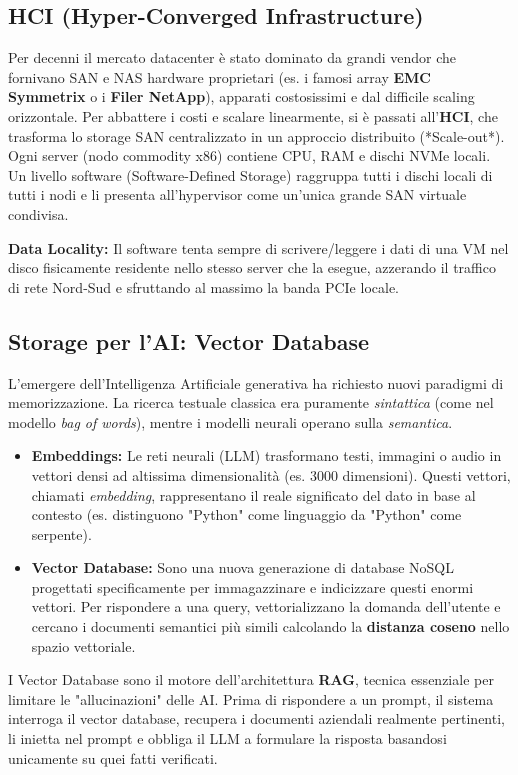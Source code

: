 \subsection{HCI (Hyper-Converged Infrastructure)}
Per decenni il mercato datacenter è stato dominato da grandi vendor che fornivano SAN e NAS hardware proprietari (es. i famosi array \textbf{EMC Symmetrix} o i \textbf{Filer NetApp}), apparati costosissimi e dal difficile scaling orizzontale. 
Per abbattere i costi e scalare linearmente, si è passati all'\textbf{HCI}, che trasforma lo storage SAN centralizzato in un approccio distribuito (*Scale-out*). Ogni server (nodo commodity x86) contiene CPU, RAM e dischi NVMe locali. Un livello software (Software-Defined Storage) raggruppa tutti i dischi locali di tutti i nodi e li presenta all'hypervisor come un'unica grande SAN virtuale condivisa.
\begin{tipbox}
\textbf{Data Locality:} Il software tenta sempre di scrivere/leggere i dati di una VM nel disco fisicamente residente nello stesso server che la esegue, azzerando il traffico di rete Nord-Sud e sfruttando al massimo la banda PCIe locale.
\end{tipbox}

\subsection{Storage per l'AI: Vector Database}
L'emergere dell'Intelligenza Artificiale generativa ha richiesto nuovi paradigmi di memorizzazione. La ricerca testuale classica era puramente \textit{sintattica} (come nel modello \textit{bag of words}), mentre i modelli neurali operano sulla \textit{semantica}.
\begin{itemize}
    \item \textbf{Embeddings:} Le reti neurali (LLM) trasformano testi, immagini o audio in vettori densi ad altissima dimensionalità (es. 3000 dimensioni). Questi vettori, chiamati \textit{embedding}, rappresentano il reale significato del dato in base al contesto (es. distinguono "Python" come linguaggio da "Python" come serpente).
    \item \textbf{Vector Database:} Sono una nuova generazione di database NoSQL progettati specificamente per immagazzinare e indicizzare questi enormi vettori. Per rispondere a una query, vettorializzano la domanda dell'utente e cercano i documenti semantici più simili calcolando la \textbf{distanza coseno} nello spazio vettoriale.
\end{itemize}
\begin{tipbox}
I Vector Database sono il motore dell'architettura \textbf{RAG}, tecnica essenziale per limitare le "allucinazioni" delle AI. Prima di rispondere a un prompt, il sistema interroga il vector database, recupera i documenti aziendali realmente pertinenti, li inietta nel prompt e obbliga il LLM a formulare la risposta basandosi unicamente su quei fatti verificati.
\end{tipbox}

